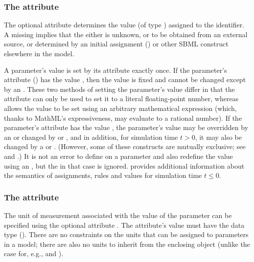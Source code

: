 \subsubsection{The  attribute}
\label{sec:parameter-value}

The optional attribute  determines the value (of type
) assigned to the identifier.  A missing
 implies that the  either is unknown, or
to be obtained from an external source, or determined by an
initial assignment () or 
other SBML construct elsewhere in the model.

A parameter's value is set by its  attribute exactly
once.  If the parameter's  attribute
() has the value ,
then the value is fixed and cannot be changed except by an
\InitialAssignment.  These two methods of setting the parameter's
value differ in that the  attribute can only be used
to set it to a literal floating-point number, whereas
\InitialAssignment allows the value to be set using an arbitrary
mathematical expression (which, thanks to MathML's expressiveness,
may evaluate to a rational number).  If the parameter's
 attribute has the value , the
parameter's value may be overridden by an \InitialAssignment or
changed by \AssignmentRule or \AlgebraicRule, and in addition, for
simulation time $t > 0$, it may also be changed by a \RateRule or
\Event.  (However, some of these constructs are mutually
exclusive; see  and .)  It
is not an error to define  on a parameter and also
redefine the value using an \InitialAssignment, but the
 in that case is ignored.
 provides additional information about
the semantics of assignments, rules and values for simulation time
$t \leq 0$.


\subsubsection{The  attribute}
\label{sec:parameter-units}

The unit of measurement associated with the value of the parameter
can be specified using the optional attribute .  The
attribute's value must have the data type 
().  There are no constraints on the
units that can be assigned to parameters in a model; there are
also no units to inherit from the enclosing \Model object (unlike
the case for, e.g., \Species and \Compartment).

